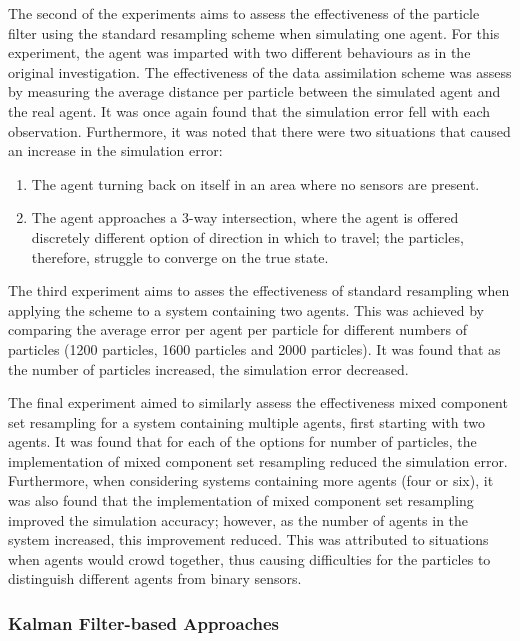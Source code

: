 The second of the experiments aims to assess the effectiveness of the particle
filter using the standard resampling scheme when simulating one agent.
For this experiment, the agent was imparted with two different behaviours as in
the original investigation.
The effectiveness of the data assimilation scheme was assess by measuring the
average distance per particle between the simulated agent and the real agent.
It was once again found that the simulation error fell with each observation.
Furthermore, it was noted that there were two situations that caused an increase
in the simulation error:
\begin{enumerate}
    \item The agent turning back on itself in an area where no sensors are
        present.
    \item The agent approaches a 3-way intersection, where the agent is offered
        discretely different option of direction in which to travel; the
        particles, therefore, struggle to converge on the true state.
\end{enumerate}

The third experiment aims to asses the effectiveness of standard resampling when
applying the scheme to a system containing two agents.
This was achieved by comparing the average error per agent per particle for
different numbers of particles (1200 particles, 1600 particles and 2000
particles).
It was found that as the number of particles increased, the simulation error
decreased.

The final experiment aimed to similarly assess the effectiveness mixed component set
resampling for a system containing multiple agents, first starting with two
agents.
It was found that for each of the options for number of particles, the
implementation of mixed component set resampling reduced the simulation error.
Furthermore, when considering systems containing more agents (four or six), it
was also found that the implementation of mixed component set resampling
improved the simulation accuracy; however, as the number of agents in the system
increased, this improvement reduced.
This was attributed to situations when agents would crowd together, thus causing
difficulties for the particles to distinguish different agents from binary
sensors.

\subsubsection{Kalman Filter-based Approaches}\label{subs:lit_rev:da_abm:kf}

